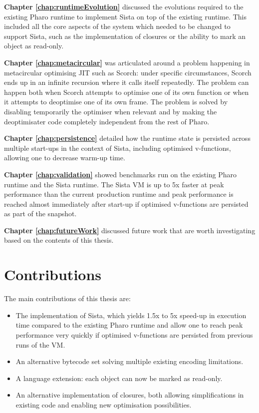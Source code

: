 \documentclass[a4paper,12pt,twoside]{../includes/ThesisStyle}
\begin{document}
\textbf{Chapter \ref{chap:runtimeEvolution}} discussed the evolutions required to the existing Pharo runtime to implement Sista on top of the existing runtime. This included all the core aspects of the system which needed to be changed to support Sista, such as the implementation of closures or the ability to mark an object as read-only.

\textbf{Chapter \ref{chap:metacircular}} was articulated around a problem happening in metacircular optimising JIT such as Scorch: under specific circumstances, Scorch ends up in an infinite recursion where it calls itself repeatedly. The problem can happen both when Scorch attempts to optimise one of its own function or when it attempts to deoptimise one of its own frame. The problem is solved by disabling temporarily the optimiser when relevant and by making the deoptimisater code completely independent from the rest of Pharo.

\textbf{Chapter \ref{chap:persistence}} detailed how the runtime state is persisted across multiple start-ups in the context of Sista, including optimised v-functions, allowing one to decrease warm-up time. 

\textbf{Chapter \ref{chap:validation}} showed benchmarks run on the existing Pharo runtime and the Sista runtime. The Sista VM is up to 5x faster at peak performance than the current production runtime and peak performance is reached almost immediately after start-up if optimised v-functions are persisted as part of the snapshot.

\textbf{Chapter \ref{chap:futureWork}} discussed future work that are worth investigating based on the contents of this thesis.

\section{Contributions}

The main contributions of this thesis are:
\begin{itemize}
	\item The implementation of Sista, which yields 1.5x to 5x speed-up in execution time compared to the existing Pharo runtime and allow one to reach peak performance very quickly if optimised v-functions are persisted from previous runs of the VM.
	\item An alternative bytecode set solving multiple existing encoding limitations.
	\item A language extension: each object can now be marked as read-only.
	\item An alternative implementation of closures, both allowing simplifications in existing code and enabling new optimisation possibilities.
\end{itemize}
\end{document}
